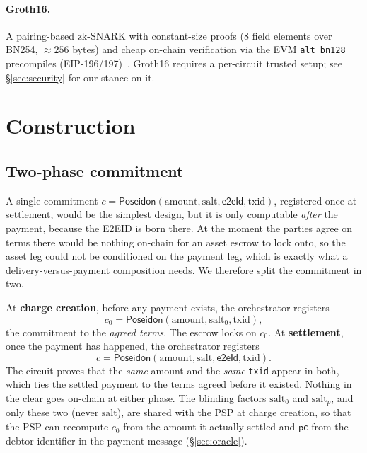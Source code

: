 \documentclass[11pt]{article}
\newcommand{\Poseidon}{\ensuremath{\mathsf{Poseidon}}}
\newcommand{\eeid}{\ensuremath{\mathsf{e2eId}}}
\newcommand{\code}[1]{\texttt{#1}}
\begin{document}
\paragraph{Groth16.} A pairing-based zk-SNARK with constant-size proofs (8 field
elements over BN254, $\approx 256$ bytes) and cheap on-chain verification via the
EVM \code{alt\_bn128} precompiles (EIP-196/197)~\cite{groth16}. Groth16 requires
a per-circuit trusted setup; see \S\ref{sec:security} for our stance on it.

\section{Construction}
\label{sec:construction}

\subsection{Two-phase commitment}
A single commitment $c=\Poseidon(\text{amount},\text{salt},\eeid,\text{txid})$,
registered once at settlement, would be the simplest design, but it is only
computable \emph{after} the payment, because the E2EID is born there. At the
moment the parties agree on terms there would be nothing on-chain for an asset
escrow to lock onto, so the asset leg could not be conditioned on the payment
leg, which is exactly what a delivery-versus-payment composition needs. We
therefore split the commitment in two.

At \textbf{charge creation}, before any payment exists, the orchestrator registers
\begin{equation}
c_0 = \Poseidon(\text{amount}, \text{salt}_0, \text{txid}),
\end{equation}
the commitment to the \emph{agreed terms}. The escrow locks on $c_0$. At
\textbf{settlement}, once the payment has happened, the orchestrator registers
\begin{equation}
c = \Poseidon(\text{amount}, \text{salt}, \eeid, \text{txid}).
\end{equation}
The circuit proves that the \emph{same} amount and the \emph{same} \code{txid}
appear in both, which ties the settled payment to the terms agreed before it
existed. Nothing in the clear goes on-chain at either phase. The blinding
factors $\text{salt}_0$ and $\text{salt}_p$, and only these two (never
$\text{salt}$), are shared with the PSP at charge creation, so that the PSP can
recompute $c_0$ from the amount it actually settled and $\mathsf{pc}$ from the
debtor identifier in the payment message (\S\ref{sec:oracle}).
\end{document}
